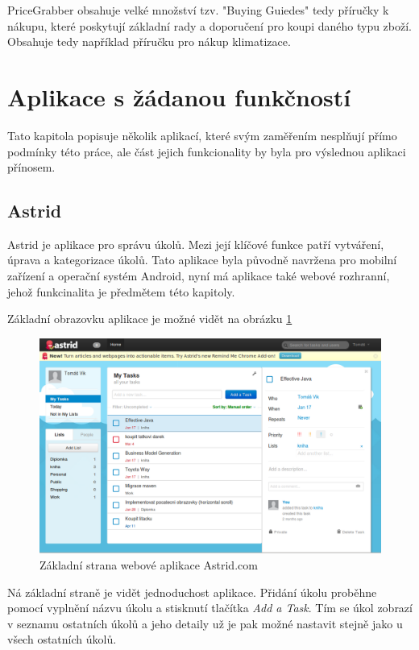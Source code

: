 PriceGrabber obsahuje velké množství tzv. "Buying Guiedes" tedy příručky k nákupu, které poskytují základní rady a doporučení pro koupi daného typu zboží. Obsahuje tedy například příručku pro nákup klimatizace.

\section{Aplikace s žádanou funkčností}
Tato kapitola popisuje několik aplikací, které svým zaměřením nesplňují přímo podmínky této práce, ale část jejich funkcionality by byla pro výslednou aplikaci přínosem.

\subsection{Astrid}
\label{sec:astrid}
Astrid je aplikace pro správu úkolů. Mezi její klíčové funkce patří vytváření, úprava a kategorizace úkolů. Tato aplikace byla původně navržena pro mobilní zařízení a operační systém Android, nyní má aplikace také webové rozhranní, jehož funkcinalita je předmětem této kapitoly.

Základní obrazovku aplikace je možné vidět na obrázku \ref{fig:astrid}

\begin{figure}[htb]
\begin{center}
\includegraphics[width=130mm]{./pictures/astrid.png}
\caption{Základní strana webové aplikace Astrid.com}
\label{fig:astrid}
\end{center}
\end{figure}

Ná základní straně je vidět jednoduchost aplikace. Přidání úkolu proběhne pomocí vyplnění názvu úkolu a stisknutí tlačítka \emph{Add a Task}. Tím se úkol zobrazí v seznamu ostatních úkolů a jeho detaily už je pak možné nastavit stejně jako u všech ostatních úkolů.

